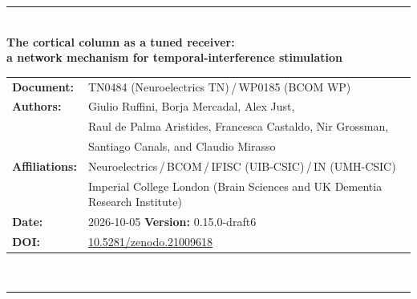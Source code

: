\documentclass[11pt,a4paper]{article}
\newif\ifsupp
\newcommand{\paperver}{0.15.0-draft6} %
\begin{document}
\vspace{6pt}
\else
\begin{flushleft}
{\color{neblue}\rule{\textwidth}{2pt}}\\[4pt]
{\LARGE\bfseries The cortical column as a tuned receiver:\\[2pt]
a network mechanism for temporal-interference stimulation}\\[10pt]
\begin{tabular}{@{}ll@{}}
\textbf{Document:} & TN0484 (Neuroelectrics TN)\,/\,WP0185 (BCOM WP) \\
\textbf{Authors:} & Giulio Ruffini, Borja Mercadal, Alex Just,\\
& Raul de Palma Aristides, Francesca Castaldo, Nir Grossman,\\
& Santiago Canals, and Claudio Mirasso \\
\textbf{Affiliations:} & Neuroelectrics\,/\,BCOM\,/\,IFISC (UIB-CSIC)\,/\,IN (UMH-CSIC)\\
& Imperial College London (Brain Sciences and UK Dementia Research Institute) \\
\textbf{Date:} & 2026-10-05 \qquad \textbf{Version:} \paperver \\
\textbf{DOI:} & \href{https://doi.org/10.5281/zenodo.21009618}{10.5281/zenodo.21009618} \\
\end{tabular}\\[4pt]
{\color{neblue}\rule{\textwidth}{1pt}}
\end{flushleft}
\fi

\ifsupp
\begin{center}
{\large\bfseries Supplementary Material}\\[4pt]
\begin{minipage}{0.86\textwidth}\centering\small
Appendices and supplementary figures accompanying the article. Section, equation and
figure numbers referenced here follow the main text; supplementary figures are numbered
S1, S2, \dots
\end{minipage}
\end{center}
\vspace{8pt}
\fi

\ifsupp\else
\end{document}
